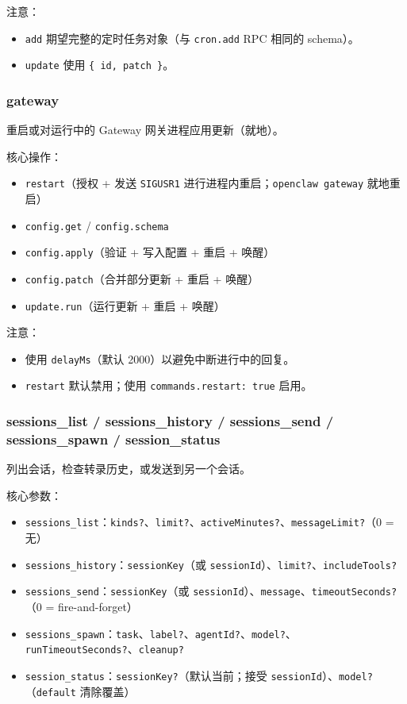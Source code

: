 注意：

\begin{itemize}
  \item \texttt{add} 期望完整的定时任务对象（与 \texttt{cron.add} RPC 相同的 schema）。
  \item \texttt{update} 使用 \texttt{\{ id, patch \}}。
\end{itemize}


\subsubsection{gateway}


重启或对运行中的 Gateway 网关进程应用更新（就地）。

核心操作：

\begin{itemize}
  \item \texttt{restart}（授权 + 发送 \texttt{SIGUSR1} 进行进程内重启；\texttt{openclaw gateway} 就地重启）
  \item \texttt{config.get} / \texttt{config.schema}
  \item \texttt{config.apply}（验证 + 写入配置 + 重启 + 唤醒）
  \item \texttt{config.patch}（合并部分更新 + 重启 + 唤醒）
  \item \texttt{update.run}（运行更新 + 重启 + 唤醒）
\end{itemize}


注意：

\begin{itemize}
  \item 使用 \texttt{delayMs}（默认 2000）以避免中断进行中的回复。
  \item \texttt{restart} 默认禁用；使用 \texttt{commands.restart: true} 启用。
\end{itemize}


\subsubsection{sessions\_list / sessions\_history / sessions\_send / sessions\_spawn / session\_status}


列出会话，检查转录历史，或发送到另一个会话。

核心参数：

\begin{itemize}
  \item \texttt{sessions\_list}：\texttt{kinds?}、\texttt{limit?}、\texttt{activeMinutes?}、\texttt{messageLimit?}（0 = 无）
  \item \texttt{sessions\_history}：\texttt{sessionKey}（或 \texttt{sessionId}）、\texttt{limit?}、\texttt{includeTools?}
  \item \texttt{sessions\_send}：\texttt{sessionKey}（或 \texttt{sessionId}）、\texttt{message}、\texttt{timeoutSeconds?}（0 = fire-and-forget）
  \item \texttt{sessions\_spawn}：\texttt{task}、\texttt{label?}、\texttt{agentId?}、\texttt{model?}、\texttt{runTimeoutSeconds?}、\texttt{cleanup?}
  \item \texttt{session\_status}：\texttt{sessionKey?}（默认当前；接受 \texttt{sessionId}）、\texttt{model?}（\texttt{default} 清除覆盖）
\end{itemize}


